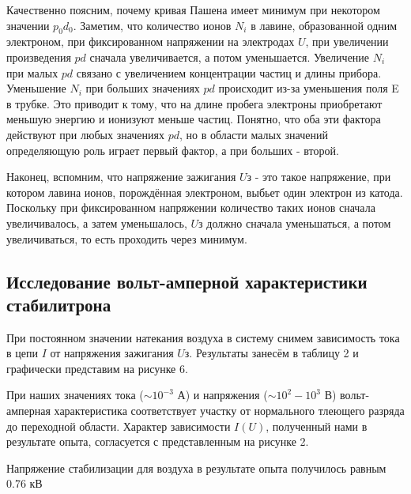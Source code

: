 \documentclass[a4paper]{article}
\begin{document}
Качественно поясним, почему кривая Пашена имеет минимум при некотором значении
$p_0d_0$. Заметим, что количество ионов $N_i$ в лавине, образованной одним электроном, при фиксированном напряжении на электродах $U$, при увеличении произведения $pd$ сначала увеличивается, а потом уменьшается. Увеличение $N_i$ при малых $pd$ связано с увеличением концентрации частиц и длины прибора. Уменьшение $N_i$ при больших значениях $pd$ происходит
из-за уменьшения поля E в трубке. Это приводит к тому, что на длине пробега электроны
приобретают меньшую энергию и ионизуют меньше частиц. Понятно, что оба эти фактора действуют при любых значениях $pd$, но в области малых значений определяющую роль
играет первый фактор, а при больших - второй. \par Наконец, вспомним, что напряжение зажигания $U$з - это такое напряжение, при котором лавина ионов, порождённая электроном,
выбьет один электрон из катода. Поскольку при фиксированном напряжении количество таких ионов сначала увеличивалось, а затем уменьшалось, $U$з должно сначала уменьшаться, а
потом увеличиваться, то есть проходить через минимум.

\subsection{Исследование вольт-амперной характеристики стабилитрона}

При постоянном значении натекания воздуха в систему снимем зависимость тока в цепи $I$ от напряжения зажигания $U$з. Результаты занесём в таблицу 2 и графически представим на рисунке 6. \par

При наших значениях тока ($\sim 10^{-3}$ А) и напряжения ($\sim 10^2 - 10^3$ В) вольт-амперная характеристика соответствует участку от нормального тлеющего разряда до переходной области. Характер зависимости $I(U)$, полученный нами в результате опыта, согласуется с представленным на рисунке 2. \par
Напряжение стабилизации для воздуха в результате опыта получилось равным 0.76 кВ
\end{document}
